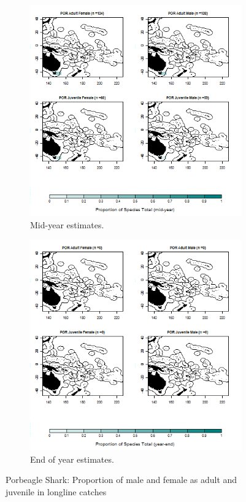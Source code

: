 \documentclass[12pt]{SCreport}
\begin{document}
\begin{landscape}
\begin{figure}
\centering
   \begin{subfigure}[b]{0.6\textwidth}
       \includegraphics[width=\textwidth]{../GRAPHICS/Map_maturity_sex_POR_MY}
       \caption{Mid-year estimates.}
       \label{fig:test1}
   \end{subfigure}
   \begin{subfigure}[b]{0.6\textwidth}
       \includegraphics[width=\textwidth]{../GRAPHICS/Map_maturity_sex_POR}
       \caption{End of year estimates.}
       \label{fig:test2}
   \end{subfigure}
\caption{Porbeagle Shark: Proportion of male and female as adult and juvenile in longline catches }
\label{fig:test} 
\end{figure}
\end{landscape}
\end{document}
